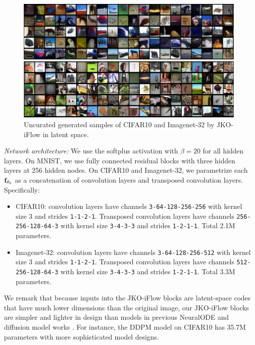 \documentclass{article}
\theoremstyle{remark}
\theoremstyle{plain}
\newcommand{\JKO}{JKO-iFlow}
\begin{document}
{{%
\begin{figure}[!t]
    \centering
    \begin{minipage}{\linewidth}
        \includegraphics[width=\linewidth]{CIFAR10_uncurated.png}
    \end{minipage}
    \begin{minipage}{\linewidth}
        \includegraphics[width=\linewidth]{ImageNet_uncurated.png}
    \end{minipage}
    \caption{Uncurated generated samples of CIFAR10 and Imagenet-32 by \JKO{} in latent space.}
    \label{fig:img_uncurated}
\end{figure}
\vspace{0.1in}
\noindent \textit{Network architecture:} 
We use the softplus activation with $\beta=20$ for all hidden layers.
%
On MNIST, we use fully connected residual blocks with three hidden layers at 256 hidden nodes.
%
On CIFAR10 and Imagenet-32, we parametrize each ${\bf f}_{\theta_b}$ as  a concatenation of convolution layers and transposed convolution layers. Specifically:
\begin{itemize}
    \item CIFAR10: convolution layers have channels \texttt{3-64-128-256-256} with kernel size 3 and strides \texttt{1-1-2-1}. Transposed convolution layers have channels \texttt{256-256-128-64-3} with kernel size \texttt{3-4-3-3} and strides \texttt{1-2-1-1}. Total 2.1M parameters.
    \item Imagenet-32: convolution layers have channels \texttt{3-64-128-256-512} with kernel size 3 and strides \texttt{1-1-2-1}. Transposed convolution layers have channels \texttt{512-256-128-64-3} with kernel size \texttt{3-4-3-3} and strides \texttt{1-2-1-1}. Total 3.3M parameters.
\end{itemize}
We remark that because inputs into the \JKO{} blocks are latent-space codes that have much lower dimensions than the original image, our \JKO{} blocks are simpler and lighter in design than models in previous NeuralODE \citep{FFJORD,finlay2020train} and diffusion model works \citep{ho2020denoising,song2021score,boffi2023probability}. For instance, the DDPM model \citep{ho2020denoising} on CIFAR10 has 35.7M parameters with more sophisticated model designs.


}}
\end{document}
